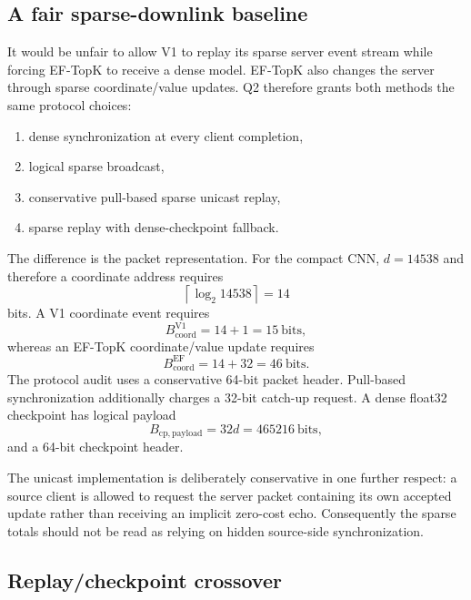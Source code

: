 \subsection{A fair sparse-downlink baseline}

It would be unfair to allow V1 to replay its sparse server event stream while forcing EF-TopK to receive a dense model. EF-TopK also changes the server through sparse coordinate/value updates. Q2 therefore grants both methods the same protocol choices:
\begin{enumerate}
    \item dense synchronization at every client completion,
    \item logical sparse broadcast,
    \item conservative pull-based sparse unicast replay,
    \item sparse replay with dense-checkpoint fallback.
\end{enumerate}
The difference is the packet representation. For the compact CNN, $d=14538$ and therefore a coordinate address requires
\begin{equation}
    \left\lceil\log_2 14538\right\rceil=14
\end{equation}
bits. A V1 coordinate event requires
\begin{equation}
    B_{\mathrm{coord}}^{\mathrm{V1}}=14+1=15\ \text{bits},
\end{equation}
whereas an EF-TopK coordinate/value update requires
\begin{equation}
    B_{\mathrm{coord}}^{\mathrm{EF}}=14+32=46\ \text{bits}.
\end{equation}
The protocol audit uses a conservative 64-bit packet header. Pull-based synchronization additionally charges a 32-bit catch-up request. A dense float32 checkpoint has logical payload
\begin{equation}
    B_{\mathrm{cp,payload}}=32d=465216\ \text{bits},
\end{equation}
and a 64-bit checkpoint header.

The unicast implementation is deliberately conservative in one further respect: a source client is allowed to request the server packet containing its own accepted update rather than receiving an implicit zero-cost echo. Consequently the sparse totals should not be read as relying on hidden source-side synchronization.

\subsection{Replay/checkpoint crossover}

